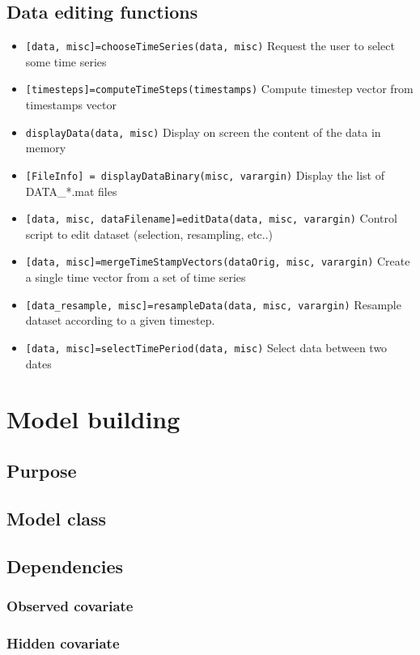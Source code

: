 \documentclass{article}
\begin{document}
\subsection{Data editing functions}

\begin{itemize}
\item \lstinline![data, misc]=chooseTimeSeries(data, misc)! Request the user to select some time series
\item \lstinline![timesteps]=computeTimeSteps(timestamps)! Compute timestep vector from timestamps vector
\item \lstinline!displayData(data, misc)! Display on screen the content of the data in memory
\item \lstinline![FileInfo] = displayDataBinary(misc, varargin)! Display the list of DATA\_*.mat files
\item \lstinline![data, misc, dataFilename]=editData(data, misc, varargin)!  Control script to edit dataset (selection, resampling, etc..)
\item \lstinline![data, misc]=mergeTimeStampVectors(dataOrig, misc, varargin)!  Create a single time vector from a set of time series
\item \lstinline![data_resample, misc]=resampleData(data, misc, varargin)! Resample dataset according to a given timestep.
\item \lstinline![data, misc]=selectTimePeriod(data, misc)! Select data between two dates
\end{itemize}


\section{Model building}
\subsection{Purpose}
\subsection{Model class}
\subsection{Dependencies}
\subsubsection{Observed covariate}
\subsubsection{Hidden covariate}
\end{document}
